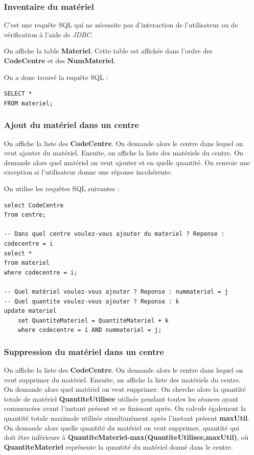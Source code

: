 \documentclass[10pt]{article}
\begin{document}
\subsubsection{Inventaire du matériel}

C'est une requête SQL qui ne nécessite pas d'interaction de l'utilisateur ou de vérification à l'aide de \emph{JDBC}.

On affiche la table \textbf{Materiel}. Cette table est affichée dans l'ordre des \textbf{CodeCentre} et des \textbf{NumMateriel}.

On a donc trouvé la requête SQL :
\begin{small}
\begin{verbatim}
SELECT *
FROM materiel;
\end{verbatim}
\end{small}

\subsubsection{Ajout du matériel dans un centre}

On affiche la liste des \textbf{CodeCentre}. On demande alors le centre dans lequel on veut ajouter du matériel. Ensuite,
on affiche la liste des matériels du centre. On demande alors quel matériel on veut ajouter et en quelle quantité. On renvoie une exception si l'utilisateur donne une réponse incohérente.

On utilise les requêtes SQL suivantes :

\begin{small}
\begin{verbatim}
select CodeCentre
from centre;

-- Dans quel centre voulez-vous ajouter du materiel ? Reponse : codecentre = i
select *
from materiel 
where codecentre = i;

-- Quel matériel voulez-vous ajouter ? Reponse : nummateriel = j
-- Quel quantite voulez-vous ajouter ? Reponse : k
update materiel
	set QuantiteMateriel = QuantiteMateriel + k
	where codecentre = i AND nummateriel = j;
\end{verbatim}
\end{small}

\subsubsection{Suppression du matériel dans un centre}

On affiche la liste des \textbf{CodeCentre}. On demande alors le centre dans lequel on veut supprimer du matériel. Ensuite, on affiche la liste des matériels du centre. On demande alors quel matériel on veut supprimer. On cherche
alors la quantité totale de matériel \textbf{QuantiteUtilisee} utilisée pendant toutes les séances ayant commencées avant l'instant présent et se finissant après. On calcule également la quantité totale maximale utilisée simultanément après l'instant présent \textbf{maxUtil}. On demande alors quelle quantité du matériel on veut supprimer, quantité qui doit être inférieure à \textbf{QuantiteMateriel-max(QuantiteUtilisee,maxUtil)}, où \textbf{QuantiteMateriel} représente la quantité du matériel donné dans le centre.
\end{document}
